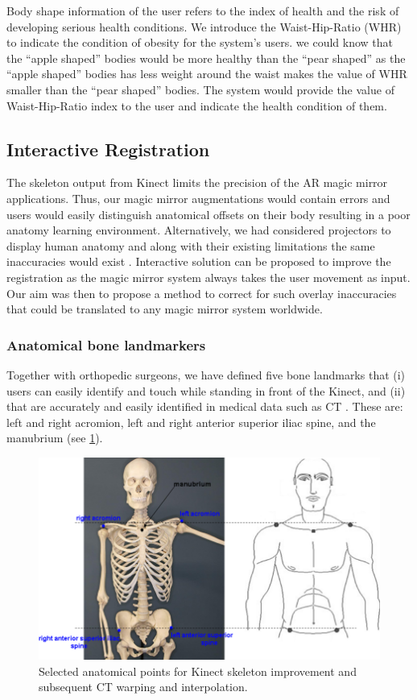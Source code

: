 Body shape information of the user refers to the index of health and the risk of developing serious health conditions. We introduce the Waist-Hip-Ratio (WHR)\cite{Consultation2008} to indicate the condition of obesity for the system's users. we could know that the “apple shaped” bodies would be more healthy than the “pear shaped” as the “apple shaped” bodies has less weight around the waist makes the value of WHR smaller than the “pear shaped” bodies.
The system would provide the value of Waist-Hip-Ratio index to the user and indicate the health condition of them.

\subsection{Interactive Registration}
The skeleton output from Kinect limits the precision of the AR magic mirror applications. Thus, our magic mirror augmentations would contain errors and users would easily distinguish anatomical offsets on their body resulting in a poor anatomy learning environment. Alternatively, we had considered projectors to display human anatomy and along with their existing limitations the same inaccuracies would exist \cite{Sun2013}. Interactive solution can be proposed to improve the registration as the magic mirror system always takes the user movement as input.
Our aim was then to propose a method to correct for such overlay inaccuracies that could be translated to any magic mirror system worldwide. 

\subsubsection{Anatomical bone landmarkers}
Together with orthopedic surgeons, we have defined five bone landmarks that (i) users can easily identify and touch while standing in front of the Kinect, and (ii) that are accurately and easily identified in medical data such as CT \cite{ma2013ismar}. These are: left and right acromion, left and right anterior superior iliac spine, and the manubrium (see \figurename{\ref{fig:3-PRMM:bonelandmarker}}).
\begin{figure}[htb]
	\centering
	\label{fig:3-PRMM:bonelandmarker}
	\includegraphics[width = 0.75\linewidth]{figures/3-PRMM/FiveBoneLandmarker.png}
	\caption{Selected anatomical points for Kinect skeleton improvement and subsequent CT warping and interpolation.}
\end{figure}

